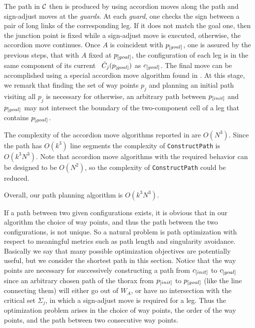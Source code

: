 \noindent {} The
path in ${\cal C}$ then is produced by using accordion moves along
the path and sign-adjust moves at the {\em guards}. At each {\em
guard}, one checks the sign between a pair of long links of the
corresponding leg. If it does not match the goal one, then the
junction point is fixed while a sign-adjust move is executed,
otherwise, the accordion move continues. Once $A$ is coincident
with $p_{\textit{\rm{[}}goal]}$, one is assured by the previous steps, that
with $A$ fixed at $p_{\textit{\rm{[}}goal]}$, the configuration of each leg
is in the same component of its current \cspace \ $\tilde
C_j(p_{\textit{\rm{[}}goal]})$ as $c_{\textit{\rm{[}}goal]}$. The final move can be
accomplished using a special accordion move algorithm found in
\cite{MT1}. At this stage, we remark that finding the set of way
points $p_j$ and planning an initial path visiting all $p_j$ is
necessary for otherwise, an arbitrary path between
$p_{\textit{\rm{[}}init]}$ and $p_{\textit{\rm{[}}goal]}$ may not intersect the
boundary of the two-component cell of a leg that contains
$p_{\textit{\rm{[}}goal]}$.

The complexity of the accordion move algorithms reported in
\cite{MT2} are $O(N^3)$. Since the path has $O(k^3)$ line segments
the complexity of {\tt ConstructPath} is $O(k^3N^3)$. Note that
accordion move algorithms with the required behavior can be
designed to be $O(N^2)$, so the complexity of {\tt ConstructPath}
could be reduced.

Overall, our path planning algorithm is  $O(k^3N^3)$.

 \label{section-4} If a
path between two given configurations exists, it is obvious that
in our algorithm the choice of way points, and thus the path
between the two configurations, is not unique. So a natural
problem is path optimization with respect to meaningful metrics
such as path length and singularity avoidance. Basically we say
that many possible optimization objectives are potentially useful,
but we consider the shortest path in this section. Notice that the
way points are necessary for successively constructing a path from
$c_{\textit{\rm{[}}init]}$ to $c_{\textit{\rm{[}}goal]}$ since an arbitrary chosen
path of the thorax from $p_{\textit{\rm{[}}init]}$ to $p_{\textit{\rm{[}}goal]}$
(like the line connecting them) will either go out of $W_A$, or
have no intersection with the critical set $\Sigma_j$, in which a
sign-adjust move is required for a leg. Thus the optimization
problem arises in the choice of way points, the order of the way
points, and the path between two consecutive way points.

